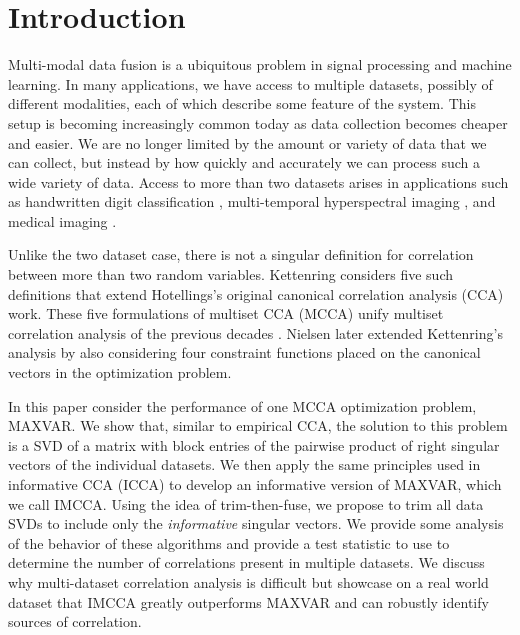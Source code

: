 \section{Introduction}
Multi-modal data fusion is a ubiquitous problem in signal processing and machine
learning. In many applications, we have access to multiple datasets, possibly of different
modalities, each of which describe some feature of the system. This setup is becoming
increasingly common today as data collection becomes cheaper and easier. We are no longer
limited by the amount or variety of data that we can collect, but instead by how quickly
and accurately we can process such a wide variety of data. Access to more
than two datasets arises in applications such as handwritten digit classification
\cite{yu2007learning}, multi-temporal hyperspectral imaging \cite{nielsen2002multiset},
and medical imaging \cite{correa2010canonical, deleus2011functional}.

Unlike the two dataset case, there is not a singular definition for correlation between
more than two random variables. Kettenring \cite{kettenring1971canonical} considers five
such definitions that extend Hotellings's \cite{hotelling1936relations} original canonical
correlation analysis (CCA) work. These five formulations of multiset CCA (MCCA) unify
multiset correlation analysis of the previous decades \cite{vinograde1950canonical,
  steel1951minimum, horst1961relations, horst1961generalized}. Nielsen
\cite{nielsen1994analysis} later extended Kettenring's analysis by also considering four
constraint functions placed on the canonical vectors in the optimization problem.

In this paper consider the performance of one MCCA optimization problem, MAXVAR. We show
that, similar to empirical CCA, the solution to this problem is a SVD of a matrix with block
entries of the pairwise product of right singular vectors of the individual datasets. We
then apply the same principles used in informative CCA (ICCA) to develop an informative version of MAXVAR,
which we call IMCCA. Using the idea of trim-then-fuse, we propose to trim all data SVDs to
include only the \textit{informative} singular vectors. We provide some analysis of the
behavior of these algorithms and provide a test statistic to use to determine the number
of correlations present in multiple datasets. We discuss why multi-dataset correlation
analysis is difficult but showcase on a real world dataset that IMCCA greatly outperforms
MAXVAR and can robustly identify sources of correlation.


